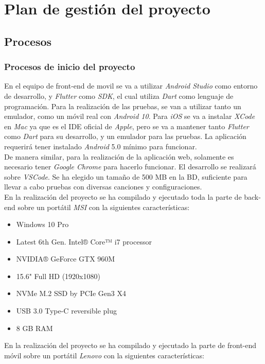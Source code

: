 \documentclass{article}
\begin{document}
\section{Plan de gestión del proyecto}

\subsection{Procesos}

\subsubsection{Procesos de inicio del proyecto}
En el equipo de front-end de movil se va a utilizar \textit{Android Studio} como entorno de desarrollo, y \textit{Flutter} como \textit{SDK}, el cual utiliza \textit{Dart} como lenguaje de programación. Para la realización de las pruebas, se van a utilizar tanto un emulador, como un móvil real con \textit{Android 10}. Para \textit{iOS} se va a instalar \textit{XCode} en \textit{Mac} ya que es el IDE oficial de \textit{Apple}, pero se va a mantener tanto \textit{Flutter} como \textit{Dart} para su desarrollo, y un emulador para las pruebas. La aplicación requerirá tener instalado \textit{Android} 5.0 mínimo para funcionar.\\
\hfill \break
De manera similar, para la realización de la aplicación web, solamente es necesario tener \textit{Google Chrome} para hacerlo funcionar. El desarrollo se realizará sobre \textit{VSCode}.
\hfill \break
Se ha elegido un tamaño de 500 MB en la BD, suficiente para llevar a cabo pruebas con diversas canciones y configuraciones.\\
\hfill \break
En la realización del proyecto se ha compilado y ejecutado toda la parte de back-end sobre un portátil \textit{MSI} con la siguientes características:
\begin{itemize}
	\item Windows 10 Pro
	\item Latest 6th Gen. Intel® Core™ i7 processor
	\item NVIDIA® GeForce GTX 960M
	\item 15.6" Full HD (1920x1080)
	\item NVMe M.2 SSD by PCIe Gen3 X4
	\item USB 3.0 Type-C reversible plug
	\item 8 GB RAM
\end{itemize}
En la realización del proyecto se ha compilado y ejecutado la parte de front-end móvil sobre un portátil \textit{Lenovo} con la siguientes características:
\end{document}
